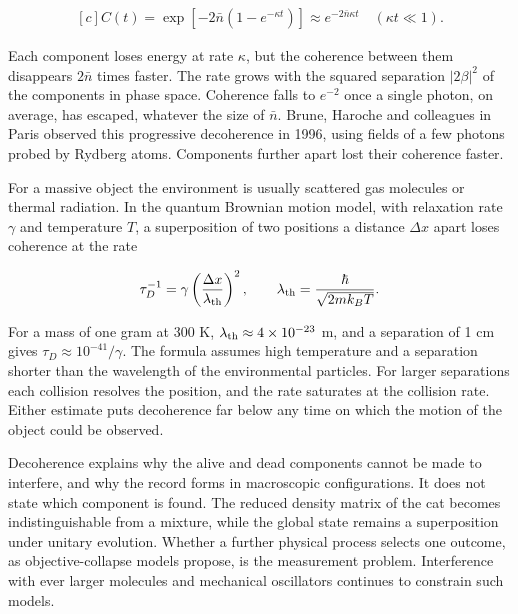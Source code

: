\documentclass[11pt,oneside]{book}
\newenvironment{centeredalign}{\[\begin{gathered}[c]}{\end{gathered}\]}
\begin{document}
\begin{centeredalign}
C(t)=\exp\!\left[-2\bar n\left(1-e^{-\kappa t}\right)\right]
\approx e^{-2\bar n\kappa t}\quad(\kappa t\ll1).
\end{centeredalign}

Each component loses energy at rate \(\kappa\), but the coherence between them disappears \(2\bar n\) times faster. The rate grows with the squared separation \(|2\beta|^2\) of the components in phase space. Coherence falls to \(e^{-2}\) once a single photon, on average, has escaped, whatever the size of \(\bar n\). Brune, Haroche and colleagues in Paris observed this progressive decoherence in 1996, using fields of a few photons probed by Rydberg atoms. Components further apart lost their coherence faster.

For a massive object the environment is usually scattered gas molecules or thermal radiation. In the quantum Brownian motion model, with relaxation rate \(\gamma\) and temperature \(T\), a superposition of two positions a distance \(\Delta x\) apart loses coherence at the rate

\begin{centeredalign}
\tau_D^{-1}=\gamma\left(\frac{\Delta x}{\lambda_{\rm th}}\right)^2,\qquad
\lambda_{\rm th}=\frac{\hbar}{\sqrt{2mk_BT}}.
\end{centeredalign}

For a mass of one gram at 300 K, \(\lambda_{\rm th}\approx4\times10^{-23}\) m, and a separation of 1 cm gives \(\tau_D\approx10^{-41}/\gamma\). The formula assumes high temperature and a separation shorter than the wavelength of the environmental particles. For larger separations each collision resolves the position, and the rate saturates at the collision rate. Either estimate puts decoherence far below any time on which the motion of the object could be observed.

Decoherence explains why the alive and dead components cannot be made to interfere, and why the record forms in macroscopic configurations. It does not state which component is found. The reduced density matrix of the cat becomes indistinguishable from a mixture, while the global state remains a superposition under unitary evolution. Whether a further physical process selects one outcome, as objective-collapse models propose, is the measurement problem. Interference with ever larger molecules and mechanical oscillators continues to constrain such models.
\end{document}
